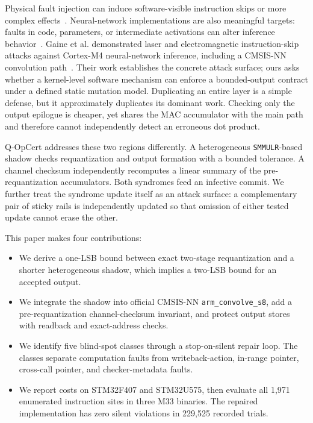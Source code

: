 \documentclass[conference]{IEEEtran}
\begin{document}
Physical fault injection can induce software-visible instruction skips or more complex effects~\cite{barenghi2012fault,moro2014experimental,dutertre2021multiskip}. Neural-network implementations are also meaningful targets: faults in code, parameters, or intermediate activations can alter inference behavior~\cite{breier2018deeplaser,yao2020deephammer}. Gaine et al. demonstrated laser and electromagnetic instruction-skip attacks against Cortex-M4 neural-network inference, including a CMSIS-NN convolution path~\cite{gaine2023embedded}. Their work establishes the concrete attack surface; ours asks whether a kernel-level software mechanism can enforce a bounded-output contract under a defined static mutation model. Duplicating an entire layer is a simple defense, but it approximately duplicates its dominant work. Checking only the output epilogue is cheaper, yet shares the MAC accumulator with the main path and therefore cannot independently detect an erroneous dot product.

Q-OpCert addresses these two regions differently. A heterogeneous \texttt{SMMULR}-based shadow checks requantization and output formation with a bounded tolerance. A channel checksum independently recomputes a linear summary of the pre-requantization accumulators. Both syndromes feed an infective commit. We further treat the syndrome update itself as an attack surface: a complementary pair of sticky rails is independently updated so that omission of either tested update cannot erase the other.

This paper makes four contributions:
\begin{itemize}
  \item We derive a one-LSB bound between exact two-stage requantization and a shorter heterogeneous shadow, which implies a two-LSB bound for an accepted output.
  \item We integrate the shadow into official CMSIS-NN \texttt{arm\_convolve\_s8}, add a pre-requantization channel-checksum invariant, and protect output stores with readback and exact-address checks.
  \item We identify five blind-spot classes through a stop-on-silent repair loop. The classes separate computation faults from writeback-action, in-range pointer, cross-call pointer, and checker-metadata faults.
  \item We report costs on STM32F407 and STM32U575, then evaluate all 1,971 enumerated instruction sites in three M33 binaries. The repaired implementation has zero silent violations in 229,525 recorded trials.
\end{itemize}
\end{document}
